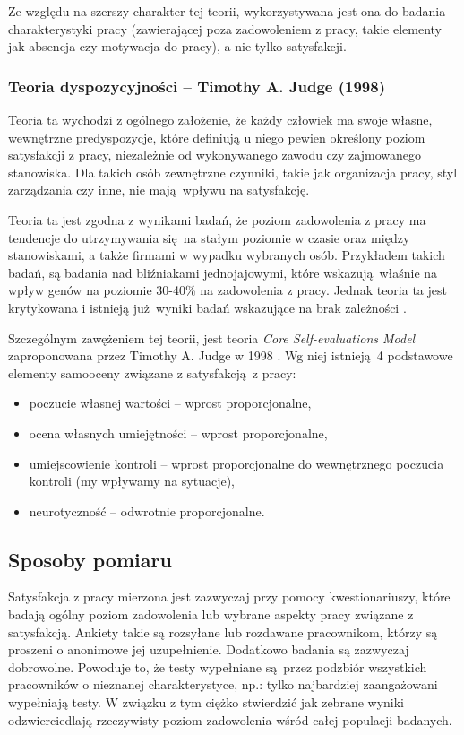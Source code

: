 Ze względu na szerszy charakter tej teorii, wykorzystywana jest ona do badania charakterystyki pracy (zawierającej poza zadowoleniem z pracy, takie elementy jak absencja czy motywacja do pracy), a nie tylko satysfakcji.

\subsubsection{Teoria dyspozycyjności -- Timothy A. Judge (1998)}
Teoria ta wychodzi z ogólnego założenie, że każdy człowiek ma swoje własne, wewnętrzne predyspozycje, które definiują u niego pewien określony poziom satysfakcji z pracy, niezależnie od wykonywanego zawodu czy zajmowanego stanowiska. Dla takich osób zewnętrzne czynniki, takie jak organizacja pracy, styl zarządzania czy inne, nie mają wpływu na satysfakcję.

Teoria ta jest zgodna z wynikami badań, że poziom zadowolenia z pracy ma tendencje do utrzymywania się na stałym poziomie w czasie oraz między stanowiskami, a także firmami w wypadku wybranych osób. Przykładem takich badań, są badania nad bliźniakami jednojajowymi, które wskazują właśnie na wpływ genów na poziomie 30-40\%  na zadowolenia z pracy. Jednak teoria ta jest krytykowana i istnieją już wyniki badań wskazujące na brak zależności \cite{schultz1985family}.

Szczególnym zawężeniem tej teorii, jest teoria \emph{Core Self-evaluations Model} zaproponowana przez Timothy A. Judge w 1998 \cite{judge1998dispositional,judge2001relationship}. Wg niej istnieją 4 podstawowe elementy samooceny związane z satysfakcją z pracy:
\begin{itemize}
\item poczucie własnej wartości -- wprost proporcjonalne,
\item ocena własnych umiejętności -- wprost proporcjonalne,
\item umiejscowienie kontroli -- wprost proporcjonalne do wewnętrznego poczucia kontroli (my wpływamy na sytuacje),
\item neurotyczność -- odwrotnie proporcjonalne.
\end{itemize}


\subsection{Sposoby pomiaru}
Satysfakcja z pracy mierzona jest zazwyczaj przy pomocy kwestionariuszy, które badają ogólny poziom zadowolenia lub wybrane aspekty pracy związane z satysfakcją. Ankiety takie są rozsyłane lub rozdawane pracownikom, którzy są proszeni o anonimowe jej uzupełnienie. Dodatkowo badania są zazwyczaj dobrowolne. Powoduje to, że testy wypełniane są przez podzbiór wszystkich pracowników o nieznanej charakterystyce, np.: tylko najbardziej zaangażowani wypełniają testy. W
związku z tym ciężko stwierdzić jak zebrane wyniki odzwierciedlają rzeczywisty poziom zadowolenia wśród całej populacji badanych.


